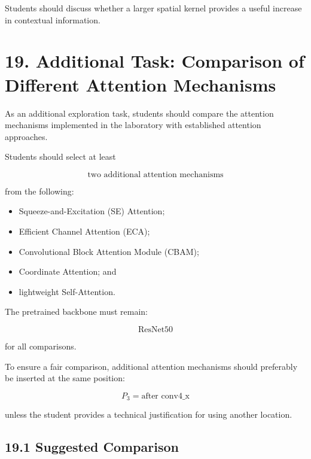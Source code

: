 \documentclass[10pt]{article}
\begin{document}
Students should discuss whether a larger spatial kernel provides a useful
increase in contextual information.

\section*{19. Additional Task: Comparison of Different Attention Mechanisms}

As an additional exploration task, students should compare the attention
mechanisms implemented in the laboratory with established attention
approaches.

Students should select at least

\[
\boxed{\text{two additional attention mechanisms}}
\]

from the following:

\begin{itemize}

\item Squeeze-and-Excitation (SE) Attention;

\item Efficient Channel Attention (ECA);

\item Convolutional Block Attention Module (CBAM);

\item Coordinate Attention; and

\item lightweight Self-Attention.

\end{itemize}

The pretrained backbone must remain:

\[
\boxed{\text{ResNet50}}
\]

for all comparisons.

To ensure a fair comparison, additional attention mechanisms should
preferably be inserted at the same position:

\[
\boxed{
P_3=\text{after conv4\_x}
}
\]

unless the student provides a technical justification for using another
location.

\subsection*{19.1 Suggested Comparison}
\end{document}
